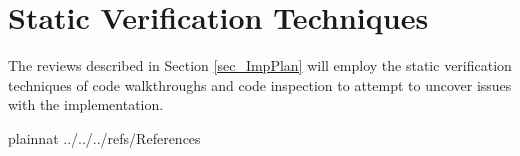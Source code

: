 \documentclass[12pt, titlepage]{article}
\begin{document}
\section{Static Verification Techniques} \label{sec_Static}

The reviews described in Section \ref{sec_ImpPlan} will employ the static 
verification techniques of code walkthroughs and code inspection to attempt to 
uncover issues with the implementation.
				
\newpage

 {plainnat}
 {../../../refs/References}


%
%
%
%
%
\end{document}
